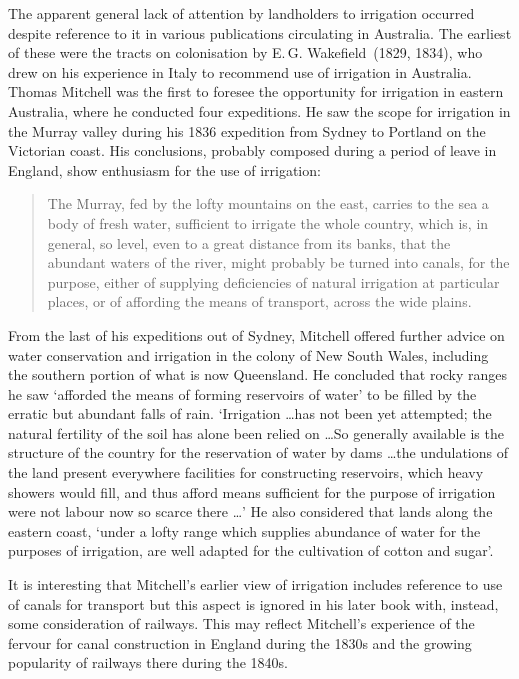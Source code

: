 The apparent general lack of attention by landholders to irrigation
occurred despite reference to it in various publications circulating
in Australia.  The earliest of these were the tracts on colonisation
by E.\,G. Wakefield~(1829, 1834),  who drew
on his experience in Italy to recommend use of irrigation in
Australia.  Thomas Mitchell  was the first to
foresee the opportunity for irrigation in eastern Australia, where he
conducted four expeditions.  He saw the scope for irrigation in the
Murray valley during his 1836 expedition from Sydney to Portland on
the Victorian coast. His conclusions, probably composed during a
period of leave in England, show enthusiasm for the use of irrigation:
\begin{quote}
	The Murray, fed by the lofty mountains on the east, carries to
	the sea a body of fresh water, sufficient to irrigate the
	whole country, which is, in general, so level, even to a great
	distance from its banks, that the abundant waters of the
	river, might probably be turned into canals, for the purpose,
	either of supplying deficiencies of natural irrigation at
	particular places, or of affording the means of transport,
	across the wide plains.
\end{quote}

From the last of his expeditions out of Sydney, Mitchell offered
further advice on water conservation and irrigation in the colony of
New South Wales, including the southern portion of what is now
Queensland.  He concluded that rocky ranges he saw `afforded the means
of forming reservoirs of water' to be filled by the erratic but
abundant falls of rain.  `Irrigation \ldots has not been yet attempted;
the natural fertility of the soil has alone been relied on \ldots So
generally available is the structure of the country for the
reservation of water by dams \ldots the undulations of the land present
everywhere facilities for constructing reservoirs, which heavy showers
would fill, and thus afford means sufficient for the purpose of
irrigation were not labour now so scarce there \ldots' He also
considered that lands along the eastern coast, `under a lofty range
which supplies abundance of water for the purposes of irrigation, are
well adapted for the cultivation of cotton and
sugar'.

It is interesting that Mitchell's earlier view of irrigation includes
reference to use of canals for transport but this aspect is ignored in
his later book with, instead, some consideration of railways.  This may
reflect Mitchell's experience of the fervour for canal construction in
England during the 1830s and the growing popularity of railways there
during the 1840s.

